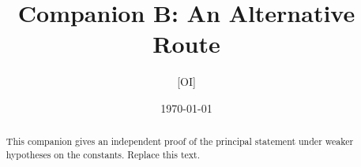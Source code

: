 \documentclass[11pt]{article}
\title{Companion B: An Alternative Route}
\author{[OI]}
\date{\today}
\begin{document}
\maketitle

\begin{abstract}
This companion gives an independent proof of the principal statement
under weaker hypotheses on the constants. Replace this text.
\end{abstract}





\end{document}
